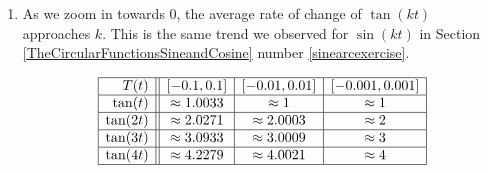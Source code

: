 \begin{enumerate}
\setcounter{enumi}{\value{HW}}
\addtocounter{enumi}{1}

\item  As we zoom in towards $0$, the average rate of change of $\tan(k t)$ approaches $k$.  This is the same trend we observed for $\sin(k t)$ in Section \ref{TheCircularFunctionsSineandCosine} number \ref{sinearcexercise}.

\[ \begin{array}{|r||c|c|c|}  \hline

 T(t) &  [-0.1, 0.1] & [-0.01, 0.01] &[-0.001, 0.001] \\ \hline
 \tan(t)     & \approx 1.0033 & \approx 1 & \approx 1 \\  \hline
 \tan(2t)   & \approx 2.0271 & \approx 2.0003 & \approx 2 \\ \hline
 \tan(3t)   & \approx 3.0933 & \approx 3.0009 & \approx 3  \\  \hline
 \tan(4t)   & \approx 4.2279 & \approx 4.0021 & \approx 4  \\  \hline

\end{array} \]


\setcounter{HW}{\value{enumi}}
\end{enumerate}

